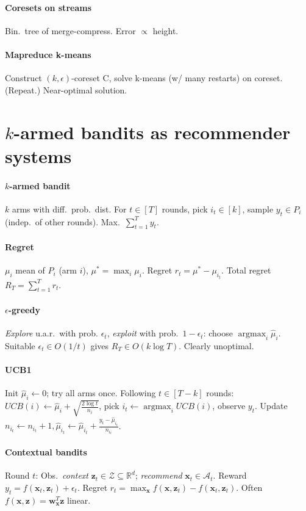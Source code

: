 \documentclass[11pt]{scrartcl}
\DeclareMathOperator{\argmax}{argmax}
\newcommand{\eps}{\epsilon}
\newcommand{\R}{\mathbb{R}}
\begin{document}
\begin{multicols}{3}
\paragraph{Coresets on streams} Bin.\ tree of merge-compress. Error $\propto$ height.

\paragraph{Mapreduce k-means} Construct $(k,\eps)$-coreset C, solve k-means (w/ many restarts) on coreset. (Repeat.) Near-optimal solution.

\section{$k$-armed bandits as recommender systems}
\paragraph{$k$-armed bandit}
$k$ arms with diff.\ prob.\ dist. For $t \in [T]$ rounds, pick $i_t\in[k]$, sample $y_t \in P_i$ (indep.\ of other rounds). Max.\ $\sum_{t=1}^{T} y_t$.
\paragraph{Regret}
$\mu_i$ mean of $P_i$ (arm $i$), $\mu^* = \max_i \mu_i$.
Regret $r_t = \mu^* - \mu_{i_t}$.
Total regret $R_T = \sum_{t=1}^{T} r_t$.
\paragraph{$\eps$-greedy} \emph{Explore} u.a.r.\ with prob. $\eps_t$, \emph{exploit} with prob.\ $1-\eps_t$: choose $\argmax_i\hat\mu_i$.
Suitable $\eps_t \in O(1/t)$ gives $R_T \in O(k\log T)$.
Clearly unoptimal.
\paragraph{UCB1}
Init $\hat\mu_i \leftarrow 0$; try all arms once.
Following $t \in [T-k]$ rounds: $UCB(i) \leftarrow \hat\mu_i+\sqrt{\frac{2\log t}{n_i}}$, pick $i_t \leftarrow \argmax_i UCB(i)$, observe $y_t$. Update $n_{i_t} \leftarrow n_{i_t}+1, \hat\mu_{i_t}\leftarrow\hat\mu_{i_t}+\frac{y_t-\hat\mu_{i_t}}{n_{i_t}}$.
\paragraph{Contextual bandits}
Round $t$: Obs.\ \emph{context} $\bm z_t \in\mathcal Z \subseteq \R^d$; \emph{recommend} $\bm x_t \in \mathcal A_t$.
Reward $y_t = f(\bm x_t,\bm z_t) + \eps_t$.
Regret $r_t = \max_{\bm x}f(\bm x, \bm z_t) - f(\bm x_t,\bm z_t)$.
Often $f(\bm x,\bm z) = \bm w_{\bm x}^T\bm z$ linear.


\end{multicols}
\end{document}
